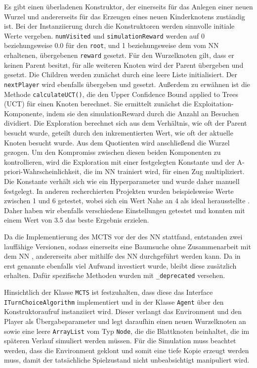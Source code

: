 \documentclass[12pt,a4paper]{article}
\begin{document}
Es gibt einen überladenen Konstruktor, der einerseits für das Anlegen einer neuen Wurzel und andererseits für das Erzeugen eines neuen Kinderknotens zuständig ist. Bei der Instanziierung durch die Konstruktoren werden sinnvolle initiale Werte vergeben. \texttt{numVisited} und \texttt{simulationReward} werden auf 0 beziehungsweise 0.0  für den \texttt{root}, und 1 beziehungsweise dem vom NN erhaltenen, übergebenen \texttt{reward} gesetzt. Für den Wurzelknoten gilt, dass er keinen Parent besitzt, für alle weiteren Knoten wird der Parent übergeben und gesetzt. Die Children werden zunächst durch eine leere Liste initialisiert. Der \texttt{nextPlayer} wird ebenfalls übergeben und gesetzt. Außerdem zu erwähnen ist die Methode \texttt{calculateUCT()}, die den Upper Confidence Bound applied to Trees (UCT) für einen Knoten berechnet. Sie ermittelt zunächst die Exploitation-Komponente, indem sie den simulationReward durch die Anzahl an Besuchen dividiert. Die Exploration berechnet sich aus dem Verhältnis, wie oft der Parent besucht wurde, geteilt durch den inkrementierten Wert, wie oft der aktuelle Knoten besucht wurde. Aus dem Quotienten wird anschließend die Wurzel gezogen. Um den Kompromiss zwischen diesen beiden Komponenten zu kontrollieren, wird die Exploration mit einer festgelegten Konstante und der A-priori-Wahrscheinlichkeit, die im NN trainiert wird, für einen Zug multipliziert. Die Konstante verhält sich wie ein Hyperparameter und wurde daher manuell festgelegt. In anderen recherchierten Projekten wurden beispielsweise Werte zwischen 1 und 6 getestet, wobei sich ein Wert Nahe an 4 als ideal herausstellte \cite{MediumPart3}. Daher haben wir ebenfalls verschiedene Einstellungen getestet und konnten mit einem Wert von 3.5 das beste Ergebnis erzielen.

Da die Implementierung des MCTS vor der des NN stattfand, entstanden zwei lauffähige Versionen, sodass einerseits eine Baumsuche ohne Zusammenarbeit mit dem NN , andererseits aber mithilfe des NN durchgeführt werden kann. Da in erst genannte ebenfalls viel Aufwand investiert wurde, bleibt diese zusätzlich erhalten. Dafür spezifische Methoden wurden mit \glqq{}\texttt{\_deprecated}\grqq{} versehen.

Hinsichtlich der Klasse \texttt{MCTS} ist festzuhalten, dass diese das Interface \texttt{ITurnChoiceAlgorithm} implementiert und in der Klasse \texttt{Agent} über den Konstruktoraufruf instanziiert wird. Dieser verlangt das Environment und den Player als Übergabeparameter und legt daraufhin einen neuen Wurzelknoten an sowie eine leere \texttt{ArrayList} vom Typ \texttt{Node}, die die Blattknoten beinhaltet, die im späteren Verlauf simuliert werden müssen. Für die Simulation muss beachtet werden, dass die Environment geklont und somit eine tiefe Kopie erzeugt werden muss, damit der tatsächliche Spielzustand nicht unbeabsichtigt manipuliert wird. 
\end{document}
